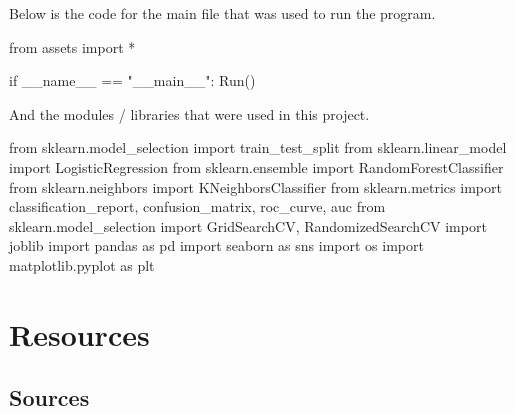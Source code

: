 {    \begin{highlight}[Main]
        Below is the code for the main file that was used to run the program.

    \begin{code}[Python]
    from assets import *

    if __name__ == "__main__":
        Run()
    \end{code}

        And the modules / libraries that were used in this project.

    \begin{code}[Python]
    from sklearn.model_selection import train_test_split
    from sklearn.linear_model import LogisticRegression
    from sklearn.ensemble import RandomForestClassifier
    from sklearn.neighbors import KNeighborsClassifier
    from sklearn.metrics import classification_report, confusion_matrix, roc_curve, auc
    from sklearn.model_selection import GridSearchCV, RandomizedSearchCV
    import joblib
    import pandas as pd
    import seaborn as sns
    import os
    import matplotlib.pyplot as plt
    \end{code}
    \end{highlight}
}


\clearpage

\chapter{Resources}

\section{Sources}

